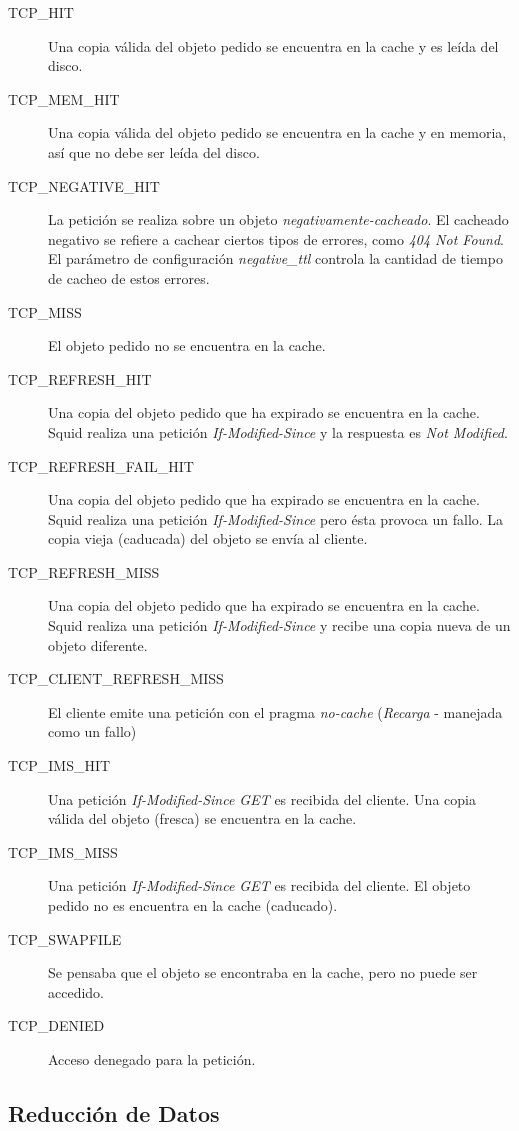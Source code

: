 \documentclass[twocolumn,twoside]{Jornadas}
\begin{document}
\begin{description}
\item[TCP\_HIT] Una copia válida del objeto pedido se encuentra en la cache y es leída del disco.
\item[TCP\_MEM\_HIT] Una copia válida del objeto pedido se encuentra en la cache y en memoria, así que no debe ser leída del disco.
\item[TCP\_NEGATIVE\_HIT] La petición se realiza sobre un objeto \emph{negativamente-cacheado}. El cacheado negativo se refiere a cachear ciertos tipos de errores, como \emph{404 Not Found}. El parámetro de configuración \emph{negative\_ttl} controla la cantidad de tiempo de cacheo de estos errores.
\item[TCP\_MISS] El objeto pedido no se encuentra en la cache.
\item[TCP\_REFRESH\_HIT] Una copia del objeto pedido que ha expirado se encuentra en la cache. Squid realiza una petición \emph{If-Modified-Since} y la respuesta es \emph{Not Modified}.
\item[TCP\_REFRESH\_FAIL\_HIT] Una copia del objeto pedido que ha expirado se encuentra en la cache. Squid realiza una petición \emph{If-Modified-Since} pero ésta provoca un fallo. La copia vieja (caducada) del objeto se envía al cliente.
\item[TCP\_REFRESH\_MISS] Una copia del objeto pedido que ha expirado se encuentra en la cache. Squid realiza una petición \emph{If-Modified-Since} y recibe una copia nueva de un objeto diferente.
\item[TCP\_CLIENT\_REFRESH\_MISS] El cliente emite una petición con el pragma \emph{no-cache} (\emph{Recarga} - manejada como un fallo)
\item[TCP\_IMS\_HIT] Una petición \emph{If-Modified-Since GET} es recibida del cliente. Una copia válida del objeto (fresca) se encuentra en la cache.
\item[TCP\_IMS\_MISS] Una petición \emph{If-Modified-Since GET} es recibida del cliente. El objeto pedido no es encuentra en la cache (caducado).
\item[TCP\_SWAPFILE] Se pensaba que el objeto se encontraba en la cache, pero no puede ser accedido.
\item[TCP\_DENIED] Acceso denegado para la petición.
\end{description}

\subsection{Reducción de Datos}
\label{red_datos}
\end{document}
